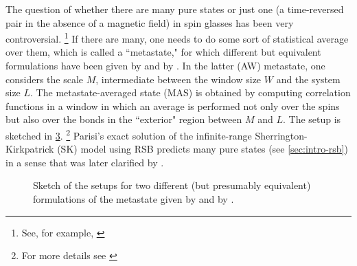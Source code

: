 The question of whether there are many pure states or just one (a time-reversed
pair in the absence of a magnetic field) in spin glasses has been very
controversial.%
\footnote{%
  See, for example,
  \textcite{%
    parisi1980order,%
    parisi1983order,%
    fisher1987absence,%
    fisher1988equilibrium,%
    moore2011disappearance%
  }
}
If there are many, one needs to do some sort of statistical average over them,
which is called a ``metastate," for which different but equivalent formulations
have been given by \textcite{newman1997metastate} and by
\textcite{aizenman1990rounding}. In the latter (AW) metastate, one considers
the scale $M$, intermediate between the window size $W$ and the system size
$L$. The metastate-averaged state (MAS) is obtained by computing correlation
functions in a window in which an average is performed not only over the spins
but also over the bonds in the ``exterior" region between $M$ and $L$.
The setup is sketched in \cref{fig:metastates}.%
\footnote{%
  For more details see
  \textcite{%
    aizenman1990rounding,%
    read2014short,%
    manssen2015aging%
  }
}
Parisi's exact solution of the infinite-range Sherrington-Kirkpatrick (SK)
model using RSB predicts many pure states (see \cref{sec:intro-rsb}) in a sense
that was later clarified by \textcite{newman1997metastate}.

\begin{figure}
  \centering
  \begin{subfigure}{0.49\textwidth}
    \centering
    
    \label{fig:ns-metastate}
  \end{subfigure}
  \begin{subfigure}{0.49\textwidth}
    \centering
    
    \label{fig:aw-metastate}
  \end{subfigure}
  \caption[
    The spin-glass metastate as defined by \textcite{newman1997metastate} and
    by \textcite{aizenman1990rounding}.
  ]
  {
    Sketch of the setups for two different (but presumably equivalent)
    formulations of the metastate given by 
    \textcite{newman1997metastate} and by 
    \textcite{aizenman1990rounding}.
  } \label{fig:metastates}
\end{figure}

